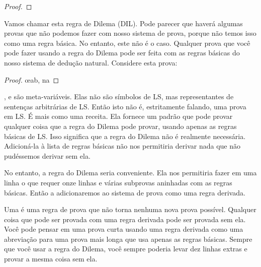 \begin{proof}
	 
\end{proof}

Vamos chamar esta regra de Dilema (DIL). Pode parecer que haverá algumas provas que não podemos fazer com nosso sistema de prova, porque não temos isso como uma regra básica. No entanto, este não é o caso. Qualquer prova que você pode fazer usando a regra do Dilema pode ser feita com as regras básicas do nosso sistema de dedução natural. Considere esta prova:

\begin{proof}
	\open
		\open
		\close
		\open
		\close
		\oe{ab, na}
	\close
	 
\end{proof}

,  e  são meta-variáveis. Elas não são símbolos de LS, mas representantes de sentenças arbitrárias de LS. Então isto não é, estritamente falando, uma prova em LS. É mais como uma receita. Ela fornece um padrão que pode provar qualquer coisa que a regra do Dilema pode provar, usando apenas as regras básicas de LS. Isso significa que a regra do Dilema não é realmente necessária. Adicioná-la à lista de regras básicas não nos permitiria derivar nada que não pudéssemos derivar sem ela.

No entanto, a regra do Dilema seria conveniente. Ela nos permitiria fazer em uma linha o que requer onze linhas e várias subprovas aninhadas com as regras básicas. Então a adicionaremos ao sistema de prova como uma regra derivada.

Uma  é uma regra de prova que não torna nenhuma nova prova possível. Qualquer coisa que pode ser provada com uma regra derivada pode ser provada sem ela. Você pode pensar em uma prova curta usando uma regra derivada como uma abreviação para uma prova mais longa que usa apenas as regras básicas. Sempre que você usar a regra do Dilema, você sempre poderia levar dez linhas extras e provar a mesma coisa sem ela.

